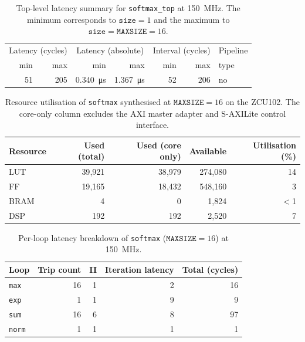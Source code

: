 \begin{table}[H]
  \centering
  \begin{tabular}{rrrrrrl}
    \toprule
    \multicolumn{2}{c}{Latency (cycles)} &
    \multicolumn{2}{c}{Latency (absolute)} &
    \multicolumn{2}{c}{Interval (cycles)} & Pipeline \\
    min & max & min & max & min & max & type \\
    \midrule
    51 & 205 & \SI{0.340}{\micro\second} & \SI{1.367}{\micro\second} & 52 & 206 & no \\
    \bottomrule
  \end{tabular}
  \caption{Top-level latency summary for \texttt{softmax\_top} at
           \SI{150}{\mega\hertz}. The minimum corresponds to
           $\texttt{size} = 1$ and the maximum to
           $\texttt{size} = \texttt{MAXSIZE} = 16$.}
  \label{tab:softmax_top_latency}
\end{table}

\begin{table}[H]
  \centering
  \begin{tabular}{lrrrr}
    \toprule
    Resource & Used (total) & Used (core only) & Available & Utilisation (\%) \\
    \midrule
    LUT  & 39{,}921 & 38{,}979 & 274{,}080 & 14 \\
    FF   & 19{,}165 & 18{,}432 & 548{,}160 &  3 \\
    BRAM & 4        & 0        &   1{,}824 & $<$1 \\
    DSP  & 192      & 192      &   2{,}520 &  7 \\
    \bottomrule
  \end{tabular}
  \caption{Resource utilisation of \texttt{softmax} synthesised at
           $\texttt{MAXSIZE} = 16$ on the ZCU102. The core-only column
           excludes the AXI master adapter and S-AXILite control
           interface.}
  \label{tab:softmax_resources}
\end{table}

\begin{table}[H]
  \centering
  \begin{tabular}{lrrrr}
    \toprule
    Loop & Trip count & II & Iteration latency & Total (cycles) \\
    \midrule
    \texttt{max}  & 16 &  1 &  2 &  16 \\
    \texttt{exp}  &  1 &  1 &  9 &   9 \\
    \texttt{sum}  & 16 &  6 &  8 &  97 \\
    \texttt{norm} &  1 &  1 &  1 &   1 \\
    \bottomrule
  \end{tabular}
  \caption{Per-loop latency breakdown of \texttt{softmax}
           ($\texttt{MAXSIZE} = 16$) at \SI{150}{\mega\hertz}.}
  \label{tab:softmax_latency}
\end{table}

